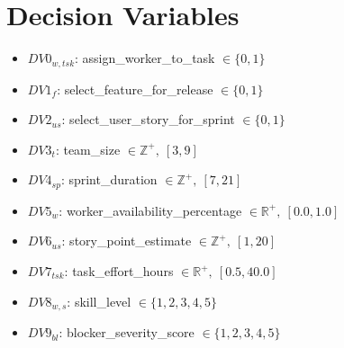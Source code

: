 \documentclass{article}
\begin{document}
\section{Decision Variables}
\begin{itemize}
    \item $DV0_{w, tsk}$: assign\_worker\_to_task $\in \{0, 1\}$
    \item $DV1_{f}$: select\_feature\_for\_release $\in \{0, 1\}$
    \item $DV2_{us}$: select\_user\_story\_for\_sprint $\in \{0, 1\}$
    \item $DV3_{t}$: team\_size $\in \mathbb{Z}^{+},\ [3, 9]$
    \item $DV4_{sp}$: sprint\_duration $\in \mathbb{Z}^{+},\ [7, 21]$
    \item $DV5_{w}$: worker\_availability\_percentage $\in \mathbb{R}^{+},\ [0.0, 1.0]$
    \item $DV6_{us}$: story\_point\_estimate $\in \mathbb{Z}^{+},\ [1, 20]$
    \item $DV7_{tsk}$: task\_effort\_hours $\in \mathbb{R}^{+},\ [0.5, 40.0]$
    \item $DV8_{w, s}$: skill\_level $\in \{1, 2, 3, 4, 5\}$
    \item $DV9_{bl}$: blocker\_severity\_score $\in \{1, 2, 3, 4, 5\}$
\end{itemize}
\end{document}
